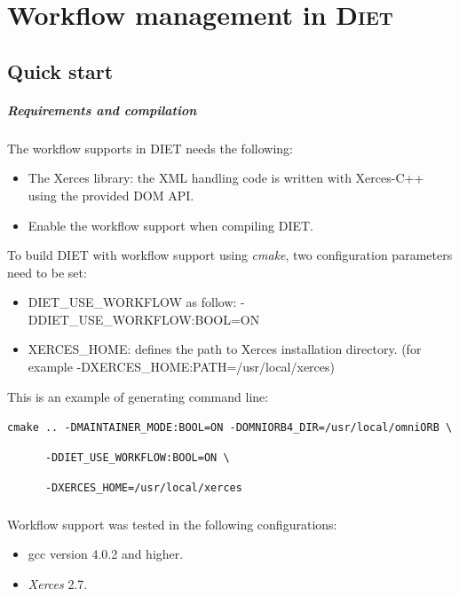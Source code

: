 \chapter{Workflow management in \textsc{Diet}}

\section{Quick start}


\paragraph{Requirements and compilation}

The workflow supports in \textsc{DIET} needs the following:

\begin{itemize}
\item The Xerces library: the XML handling code is written with
  Xerces-C++ using the provided DOM API.
\item Enable the workflow support when compiling DIET.
\end{itemize}

To build DIET with workflow support using \textit{cmake}, two
configuration parameters need to be set:

\begin{itemize}
\item DIET\_USE\_WORKFLOW as follow: -DDIET\_USE\_WORKFLOW:BOOL=ON
\item XERCES\_HOME: defines the path to Xerces installation directory.
  (for example -DXERCES\_HOME:PATH=/usr/local/xerces)
\end{itemize}

This is an example of generating command line:

\verb|cmake .. -DMAINTAINER_MODE:BOOL=ON -DOMNIORB4_DIR=/usr/local/omniORB \|

\verb|      -DDIET_USE_WORKFLOW:BOOL=ON \|

\verb|      -DXERCES_HOME=/usr/local/xerces|


\paragraph{}
Workflow support was tested in the following configurations:

\begin{itemize}
\item gcc version 4.0.2 and higher.
\item \textit{Xerces} 2.7.
\end{itemize}

